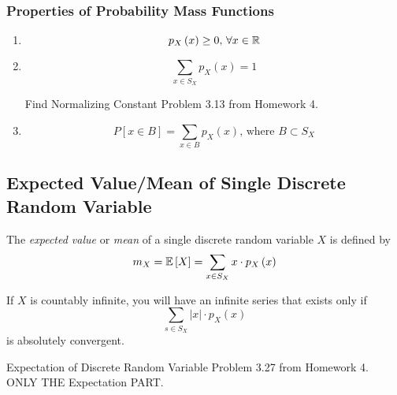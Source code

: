 		\subsubsection{Properties of Probability Mass Functions} \label{subsubsec:Properties of Probability Mass Functions}
			\begin{enumerate}[label=\textbf{(\roman*)}, noitemsep, nolistsep]
				\item
					\begin{equation}
						p_{X} \left( x \right) \geq 0 \text{, } \forall x \in \operatorname{\mathbb{R}}
					\end{equation}
				\item
					\begin{equation}
						\sum\limits_{x \in S_{X}} p_{X} \left( x \right) = 1
					\end{equation}
					\begin{example}[Problem 3.13]{Find Normalizing Constant}
						Problem 3.13 from Homework 4.
					\end{example}
				\item
					\begin{equation}
						P \left[ x \in B \right] = \sum\limits_{x \in B} p_{X} \left( x \right) \text{, where } B \subset S_{X}
					\end{equation}
			\end{enumerate}
		
	\subsection{Expected Value/Mean of Single Discrete Random Variable} \label{subsec:Expected Value of Single Discrete}
		\begin{definition} \label{def:Expected Value of Single Discrete}
			The \emph{expected value} or \emph{mean} of a single discrete random variable $X$ is defined by
			\begin{equation} \label{eq:Expected Value of Single Discrete}
				m_{X} = \operatorname{\operatorname{\mathbb{E}}} \left[ X \right] = \sum_{x \in S_{X}} x \cdot p_{X} \left( x \right)
			\end{equation}
			\begin{remark} \label{rmk:Expected Value of Single Discrete Countably Infinite}
				If $X$ is countably infinite, you will have an infinite series that exists only if
				\begin{equation} \label{eq:Expected Value of Single Discrete Countably Infinite}
					\sum_{s \in S_{X}} \lvert x \rvert \cdot p_{X} \left( x \right)
				\end{equation}
				is absolutely convergent.
			\end{remark}
		\end{definition}
		\begin{example}[Problem 3.27]{Expectation of Discrete Random Variable}
			Problem 3.27 from Homework 4. ONLY THE Expectation PART.
		\end{example}
	
